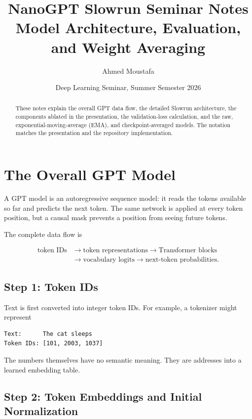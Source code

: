 \documentclass[11pt,a4paper]{article}
\title{\textcolor{hhublue}{NanoGPT Slowrun Seminar Notes}\\
  \large Model Architecture, Evaluation, and Weight Averaging}
\author{Ahmed Moustafa}
\date{Deep Learning Seminar, Summer Semester 2026}
\begin{document}
\maketitle
\thispagestyle{fancy}

\begin{abstract}
These notes explain the overall GPT data flow, the detailed Slowrun architecture,
the components ablated in the presentation, the validation-loss calculation, and
the raw, exponential-moving-average (EMA), and checkpoint-averaged models. The
notation matches the presentation and the repository implementation.
\end{abstract}

\tableofcontents

\clearpage
\section{The Overall GPT Model}

A GPT model is an autoregressive sequence model: it reads the tokens available
so far and predicts the next token. The same network is applied at every token
position, but a causal mask prevents a position from seeing future tokens.

The complete data flow is

\begin{equation}
  \begin{aligned}
    \text{token IDs}
    &\longrightarrow \text{token representations}
    \longrightarrow \text{Transformer blocks}\\
    &\longrightarrow \text{vocabulary logits}
    \longrightarrow \text{next-token probabilities}.
  \end{aligned}
\end{equation}

\subsection{Step 1: Token IDs}

Text is first converted into integer token IDs. For example, a tokenizer might
represent

\begin{lstlisting}
Text:      The cat sleeps
Token IDs: [101, 2003, 1037]
\end{lstlisting}

The numbers themselves have no semantic meaning. They are addresses into a
learned embedding table.

\subsection{Step 2: Token Embeddings and Initial Normalization}
\end{document}
